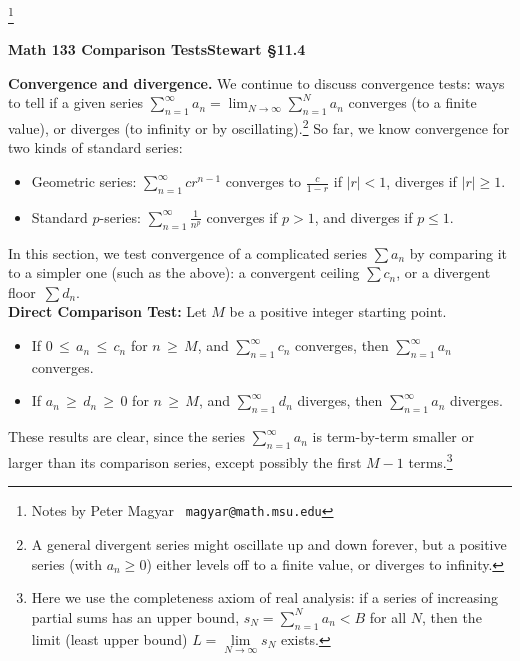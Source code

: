\documentclass[11pt]{article}
\begin{document}
\footnote[0]{Notes by Peter Magyar \ {\tt magyar@math.msu.edu}}
\vspace{-1em}

\centerline{\bf Math 133\hspace{1.5em} \hfill{\Large\bf
Comparison Tests}\hfill Stewart \S11.4}
\vspace{1em}

\noindent 
{\bf Convergence and divergence.} We continue to discuss convergence tests: ways to tell if a given series $\sum_{n=1}^\infty a_n=\lim_{N\to\infty} \sum_{n=1}^N a_n$ converges (to a finite value),
or diverges (to infinity or by oscillating).\footnote{
A general divergent series might oscillate up and down forever, but a positive series (with $a_n\geq 0$) either levels off to a finite value, or diverges to infinity.
}
So far, we know convergence for two kinds of standard series:
\begin{itemize}

\item Geometric series: $\sum_{n=1}^\infty cr^{n-1}$ converges to $\frac{c}{1-r}$ if $|r|<1$, diverges if $|r|\geq 1$.

\item Standard $p$-series: $\sum_{n=1}^\infty \frac{1}{n^p}$ converges if $p>1$, and diverges if $p\leq 1$.

\end{itemize}
%
In this section, we test convergence of a complicated series $\sum a_n$ by comparing it to a simpler one 
(such as the above): a convergent ceiling $\sum c_n$, or a divergent floor~$\sum d_n$.
\\[1em]
{\bf  Direct Comparison Test:} Let $M$ be a positive integer starting point.
\begin{itemize}

\item If $0\,{\leq}\, a_n\,{\leq}\, c_n$ for $n\,{\geq}\,M$, and $\sum\limits_{n=1}^\infty c_n$ converges, then $\sum\limits_{n=1}^\infty a_n$ converges.

\item If $a_n\,{\geq}\, d_n\,{\geq}\, 0$ for $n\,{\geq}\,M$, and $\sum\limits_{n=1}^\infty d_n$ diverges, then $\sum\limits_{n=1}^\infty a_n$ diverges.
\end{itemize}
%
These results are clear, since the series $\sum_{n=1}^\infty a_n$ is term-by-term smaller or larger than its comparison series, except possibly the first $M{-}1$ terms.\footnote{
Here we use the completeness axiom of real analysis: if a series of increasing partial sums 
has an upper bound, $s_N=\sum_{n=1}^N a_n<B$ for all $N$, then the limit (least upper bound)
$L=\lim\limits_{N\to \infty} s_N$ exists.
}
\end{document}
